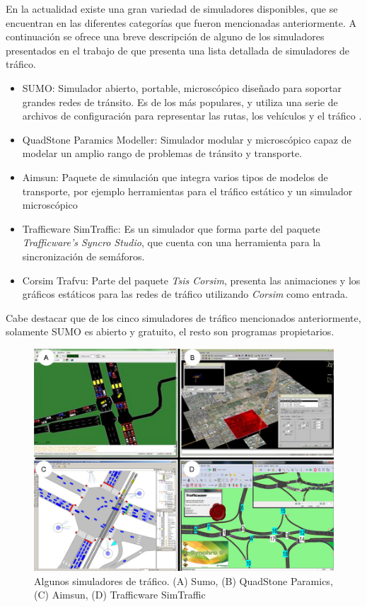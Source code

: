 En la actualidad existe una gran variedad de simuladores disponibles, que se encuentran en las diferentes categorías que fueron mencionadas anteriormente. A continuación se ofrece una breve descripción de alguno de los simuladores presentados en el trabajo de \citet{review_trafico} que presenta una lista detallada de simuladores de tráfico.
\begin{itemize}
	\item SUMO: Simulador abierto, portable, microscópico diseñado para soportar grandes redes de tránsito. Es de los más populares, y utiliza una serie de archivos de configuración para representar las rutas, los vehículos y el tráfico \citep{SUMO}.
	\item QuadStone Paramics Modeller: Simulador modular y microscópico capaz de modelar un amplio rango de problemas de tránsito y transporte.
	\item Aimsun: Paquete de simulación que integra varios tipos de modelos de transporte, por ejemplo herramientas para el tráfico estático y un simulador microscópico
	\item Trafficware SimTraffic: Es un simulador que forma parte del paquete \emph{Trafficware's Syncro Studio}, que cuenta con una herramienta para la sincronización de semáforos.
	\item Corsim Trafvu: Parte del paquete \emph{Tsis Corsim}, presenta las animaciones y los gráficos estáticos para las redes de tráfico utilizando \emph{Corsim} como entrada.
\end{itemize}

Cabe destacar que de los cinco simuladores de tráfico mencionados anteriormente, solamente SUMO es abierto y gratuito, el resto son programas propietarios. 

\begin{figure}[H]
	\centering
	\includegraphics[width=0.9\linewidth]{Figures/simuladores}
	\caption[]{Algunos simuladores de tráfico. (A) Sumo, (B) QuadStone Paramics, (C) Aimsun, (D) Trafficware SimTraffic}
	\label{fig:simuladores}
\end{figure}

